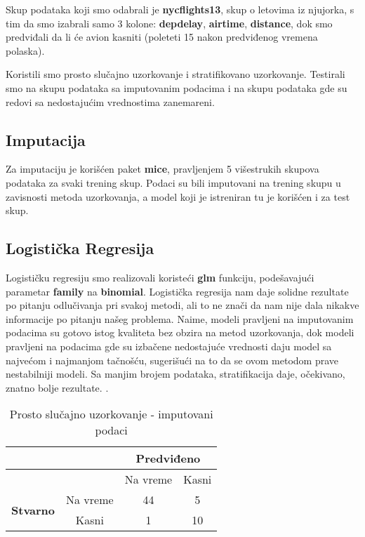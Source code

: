 \documentclass{article}
\begin{document}
Skup podataka koji smo odabrali je \textbf{nycflights13}, skup o letovima iz njujorka, s tim da smo izabrali samo 3 kolone: \textbf{depdelay}, \textbf{airtime}, \textbf{distance}, dok smo predviđali da li će avion kasniti (poleteti 15 nakon predviđenog vremena polaska).

Koristili smo prosto slučajno uzorkovanje i stratifikovano uzorkovanje. Testirali smo na skupu podataka sa imputovanim podacima i na skupu podataka gde su redovi sa nedostajućim vrednostima zanemareni.

\subsection*{Imputacija}

Za imputaciju je korišćen paket \textbf{mice}, pravljenjem 5 višestrukih skupova podataka za svaki trening skup. Podaci su bili imputovani na trening skupu u zavisnosti metoda uzorkovanja, a model koji je istreniran tu je korišćen i za test skup.

\newpage

\subsection*{Logistička Regresija}

Logističku regresiju smo realizovali koristeći \textbf{glm} funkciju, podešavajući parametar \textbf{family} na \textbf{binomial}. Logistička regresija nam daje solidne rezultate po pitanju odlučivanja pri svakoj metodi, ali to ne znači da nam nije dala nikakve informacije po pitanju našeg problema. Naime, modeli pravljeni na imputovanim podacima su gotovo istog kvaliteta bez obzira na metod uzorkovanja, dok modeli pravljeni na podacima gde su izbačene nedostajuće vrednosti daju model sa najvećom i najmanjom tačnošću, sugerišući na to da se ovom metodom prave nestabilniji modeli. Sa manjim brojem podataka, stratifikacija daje, očekivano, znatno bolje rezultate. \cite{githubrepo}.

\begin{table}[H]
    \centering
    \begin{tabular}{|c|c|c|c|}
        \hline
        \multicolumn{2}{|c|}{} & \multicolumn{2}{c|}{\textbf{Predviđeno}} \\
        \hline
        \multicolumn{2}{|c|}{} & Na vreme & Kasni \\
        \hline
        \multirow{2}{*}{\textbf{Stvarno}} & Na vreme & 44 & 5 \\
        \cline{2-4}
         & Kasni & 1 & 10 \\
        \hline
    \end{tabular}
    \caption{Prosto slučajno uzorkovanje - imputovani podaci}
    \label{table:confusion_matrix1}
\end{table}
\end{document}
